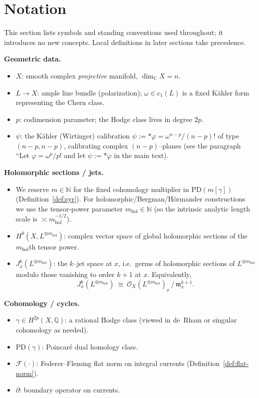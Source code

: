 \documentclass[11pt]{article}
\numberwithin{equation}{section}  %
\theoremstyle{plain}
\theoremstyle{definition}
\theoremstyle{remark}
\newcommand{\C}{\mathbb{C}}
\newcommand{\Q}{\mathbb{Q}}
\newcommand{\mhol}{m_{\mathrm{hol}}} %
\begin{document}
\section{Notation}\label{sec:notation}
This section lists symbols and standing conventions used throughout; it introduces no new concepts. Local definitions in later sections take precedence.

\medskip
\noindent\textbf{Geometric data.}
\begin{itemize}
\item $X$: smooth complex \emph{projective} manifold, $\dim_\C X=n$.
\item $L\to X$: ample line bundle (polarization); $\omega\in c_1(L)$ is a fixed K\"ahler form representing the Chern class.
\item $p$: codimension parameter; the Hodge class lives in degree $2p$.
\item $\psi$: the K\"ahler (Wirtinger) calibration $\psi:=*\varphi=\omega^{n-p}/(n-p)!$ of type $(n-p,n-p)$, calibrating complex $(n-p)$--planes (see the paragraph ``Let $\varphi=\omega^p/p!$ and let $\psi:=*\varphi$ in the main text).
\end{itemize}


\noindent\textbf{Holomorphic sections / jets.}
\begin{itemize}
\item We reserve $m\in\mathbb{N}$ for the fixed cohomology multiplier in $\mathrm{PD}(m[\gamma])$
(Definition~\ref{def:syr}).  For holomorphic/Bergman/H\"ormander constructions we use the tensor-power parameter
$\mhol\in\mathbb{N}$ (so the intrinsic analytic length scale is $\asymp \mhol^{-1/2}$).
\item $H^0(X,L^{\otimes \mhol})$: complex vector space of global holomorphic sections of the $\mhol$th tensor power.
\item $J_x^k(L^{\otimes \mhol})$: the $k$--jet space at $x$, i.e.\ germs of holomorphic sections of $L^{\otimes \mhol}$
modulo those vanishing to order $k+1$ at $x$. Equivalently,
\[
J_x^k(L^{\otimes \mhol})\ \cong\ \mathcal{O}_X(L^{\otimes \mhol})_x\,/\,\mathfrak{m}_x^{k+1}.
\]
\end{itemize}

\noindent\textbf{Cohomology / cycles.}
\begin{itemize}
\item $\gamma\in H^{2p}(X,\Q)$: a rational Hodge class (viewed in de~Rham or singular cohomology as needed).
\item $\mathrm{PD}(\gamma)$: Poincar\'e dual homology class.
\item $\mathcal{F}(\cdot)$: Federer--Fleming flat norm on integral currents (Definition~\ref{def:flat-norm}).
\item $\partial$: boundary operator on currents.
\end{itemize}
\end{document}
